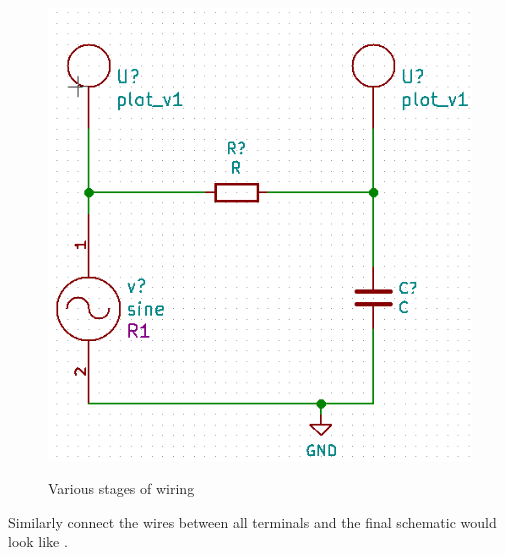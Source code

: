 \begin{figure}[h]
{\includegraphics[width=\tnfig]{manual_images/wirefin.png}
\label{wirefin}} \hfill
{}
\caption{Various stages of wiring}
\end{figure}
Similarly connect the wires between all terminals and the final
schematic would look like . 


